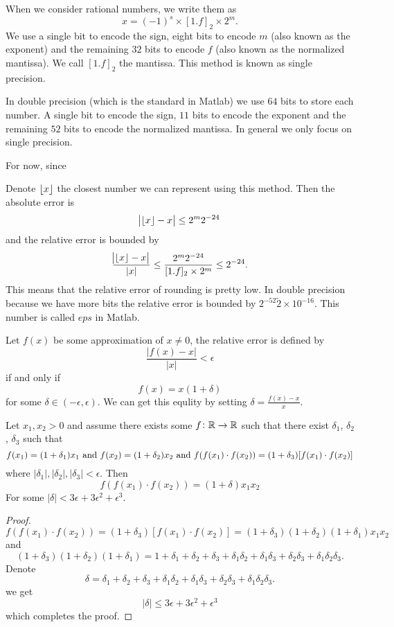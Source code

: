 \documentclass[11pt,a4paper]{article}
\begin{document}
When we consider rational numbers, we write them as
\[
    x = (-1)^s \times [1.f]_2 \times 2^m.
\]
We use a single bit to encode the sign, eight bits to encode $m$ (also
known as the exponent) and the remaining $32$ bits to encode $f$ (also known
as the normalized mantissa). We call $[1.f]_2$ the mantissa.
This method is known as single precision.

In double precision (which is the standard in Matlab) we use $64$ bits
to store each number. A single bit to encode the sign, $11$ bits to encode 
the exponent and the remaining $52$ bits to encode the normalized mantissa.
In general we only focus on single precision.

For now, since


Denote $\left\lfloor x \right\rfloor$ the closest number we can represent using this method.
Then the absolute error is
\[
  \abs{\left\lfloor x \right\rfloor - x} \le 2^m 2^{-24}
\]
and the relative error is bounded by
\[
  \frac{\abs{\left\lfloor x \right\rfloor - x}}{|x|} \le
  \frac{2^m 2^{-24}}{[1.f]_2 \times 2^m} \le
  2^{-24}.
\]
This means that the relative error of rounding is pretty low.
In double precision because we have more bits the relative error
is bounded by $2^{-52} \tilde 2 \times 10^{-16}$.
This number is called $eps$ in Matlab.

\begin{definition}
  Let $f(x)$ be some approximation of $x \neq 0$, the relative error
  is defined by
  \[
    \frac{|f(x) - x|}{|x|} < \epsilon
  \]
  if and only if
  \[
    f(x)= x(1 + \delta)
  \]
  for some $\delta \in (-\epsilon, \epsilon)$.
  We can get this equlity by setting $\delta = \frac{f(x) - x}{x}$.
\end{definition}

\begin{proposition}
  Let $x_1,x_2 > 0$ and assume there exists some $f \colon \mathbb{R} \to \mathbb{R}$ such that
  there exist $\delta_1$, $\delta_2$, $\delta_3$ such that
  \[
    f(x_1) = (1 + \delta_1) x_1 \text{ and }
    f(x_2) = (1 + \delta_2) x_2 \text{ and }
    f(f(x_1) \cdot f(x_2)) = (1 + \delta_3)[f(x_1) \cdot f(x_2)]
  \]
  where $|\delta_1|, |\delta_2|, |\delta_3| < \epsilon$.
  Then
  \[
    f(f(x_1) \cdot f(x_2)) =
    (1 + \delta) x_1 x_2
  \]
  For some $|\delta| < 3 \epsilon + 3 \epsilon^2 + \epsilon^3$.
\end{proposition}
\begin{proof}
  \[
    f(f(x_1) \cdot f(x_2)) =
    (1 + \delta_3)[f(x_1) \cdot f(x_2)] =
    (1 + \delta_3)(1 + \delta_2)(1 + \delta_1) x_1 x_2
  \]
  and
  \[
    (1 + \delta_3)(1 + \delta_2)(1 + \delta_1) =
    1 + \delta_1 + \delta_2 + \delta_3 + 
    \delta_1 \delta_2 + \delta_1 \delta_3 + \delta_2 \delta_3 + 
    \delta_1 \delta_2 \delta_3.
  \]
  Denote
  \[
    \delta =
    \delta_1 + \delta_2 + \delta_3 + 
    \delta_1 \delta_2 + \delta_1 \delta_3 + \delta_2 \delta_3 + 
    \delta_1 \delta_2 \delta_3.
  \]
  we get
  \[
    |\delta| \le 3 \epsilon + 3 \epsilon^2 + \epsilon^3
  \]
  which completes the proof.
\end{proof}
\end{document}
